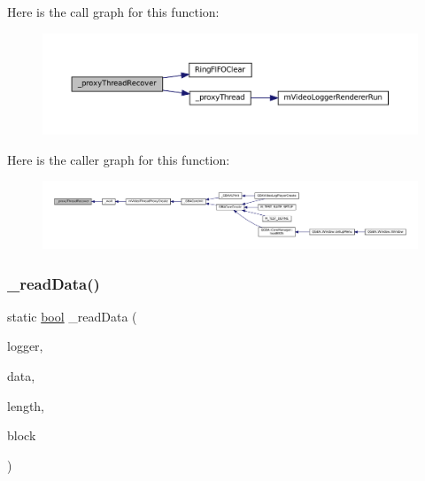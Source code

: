 Here is the call graph for this function\+:
\nopagebreak
\begin{figure}[H]
\begin{center}
\leavevmode
\includegraphics[width=350pt]{thread-proxy_8c_a9f7602077816bb1ca3bf15db67d76f17_cgraph}
\end{center}
\end{figure}
Here is the caller graph for this function\+:
\nopagebreak
\begin{figure}[H]
\begin{center}
\leavevmode
\includegraphics[width=350pt]{thread-proxy_8c_a9f7602077816bb1ca3bf15db67d76f17_icgraph}
\end{center}
\end{figure}
\mbox{\label{thread-proxy_8c_abcbab73349348e3342c1e7255ed55ee4}} 
\subsubsection{\texorpdfstring{\+\_\+read\+Data()}{\_readData()}}
{\footnotesize\ttfamily static \mbox{\hyperlink{libretro_8h_a4a26dcae73fb7e1528214a068aca317e}{bool}} \+\_\+read\+Data (\begin{DoxyParamCaption}\item[{struct m\+Video\+Logger $\ast$}]{logger,  }\item[{void $\ast$}]{data,  }\item[{size\+\_\+t}]{length,  }\item[{\mbox{\hyperlink{libretro_8h_a4a26dcae73fb7e1528214a068aca317e}{bool}}}]{block }\end{DoxyParamCaption})\hspace{0.3cm}{\ttfamily [static]}}

